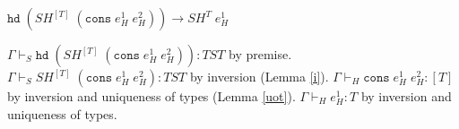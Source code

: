 \begin{case}
$\mathtt{hd}\;(SH^{[T]}\;(\mathtt{cons}\;e_{H}^{1}\;e_{H}^{2}))\rightarrow SH^{T}\;e_{H}^{1}$

$\Gamma\vdash_{S}\mathtt{hd}\;(SH^{[T]}\;(\mathtt{cons}\;e_{H}^{1}\;e_{H}^{2})):TST$ by premise.  $\Gamma\vdash_{S}SH^{[T]}\;(\mathtt{cons}\;e_{H}^{1}\;e_{H}^{2}):TST$ by inversion (Lemma \ref{i}).  $\Gamma\vdash_{H}\mathtt{cons}\;e_{H}^{1}\;e_{H}^{2}:[T]$ by inversion and uniqueness of types (Lemma \ref{uot}).  $\Gamma\vdash_{H}e_{H}^{1}:T$ by inversion and uniqueness of types.
\end{case}